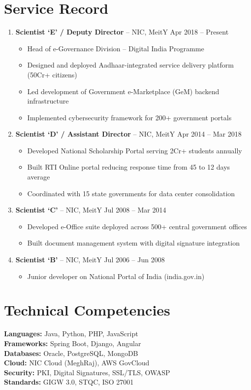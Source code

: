 \documentclass[12pt,letterpaper]{article}
\begin{document}
\section{Service Record}
\begin{enumerate}
\item \textbf{Scientist `E' / Deputy Director} -- NIC, MeitY \hfill Apr 2018 -- Present
\begin{itemize}
\item Head of e-Governance Division -- Digital India Programme
\item Designed and deployed Aadhaar-integrated service delivery platform (50Cr+ citizens)
\item Led development of Government e-Marketplace (GeM) backend infrastructure
\item Implemented cybersecurity framework for 200+ government portals
\end{itemize}

\item \textbf{Scientist `D' / Assistant Director} -- NIC, MeitY \hfill Apr 2014 -- Mar 2018
\begin{itemize}
\item Developed National Scholarship Portal serving 2Cr+ students annually
\item Built RTI Online portal reducing response time from 45 to 12 days average
\item Coordinated with 15 state governments for data center consolidation
\end{itemize}

\item \textbf{Scientist `C'} -- NIC, MeitY \hfill Jul 2008 -- Mar 2014
\begin{itemize}
\item Developed e-Office suite deployed across 500+ central government offices
\item Built document management system with digital signature integration
\end{itemize}

\item \textbf{Scientist `B'} -- NIC, MeitY \hfill Jul 2006 -- Jun 2008
\begin{itemize}
\item Junior developer on National Portal of India (india.gov.in)
\end{itemize}
\end{enumerate}

\section{Technical Competencies}
\textbf{Languages:} Java, Python, PHP, JavaScript\\
\textbf{Frameworks:} Spring Boot, Django, Angular\\
\textbf{Databases:} Oracle, PostgreSQL, MongoDB\\
\textbf{Cloud:} NIC Cloud (MeghRaj), AWS GovCloud\\
\textbf{Security:} PKI, Digital Signatures, SSL/TLS, OWASP\\
\textbf{Standards:} GIGW 3.0, STQC, ISO 27001
\end{document}

